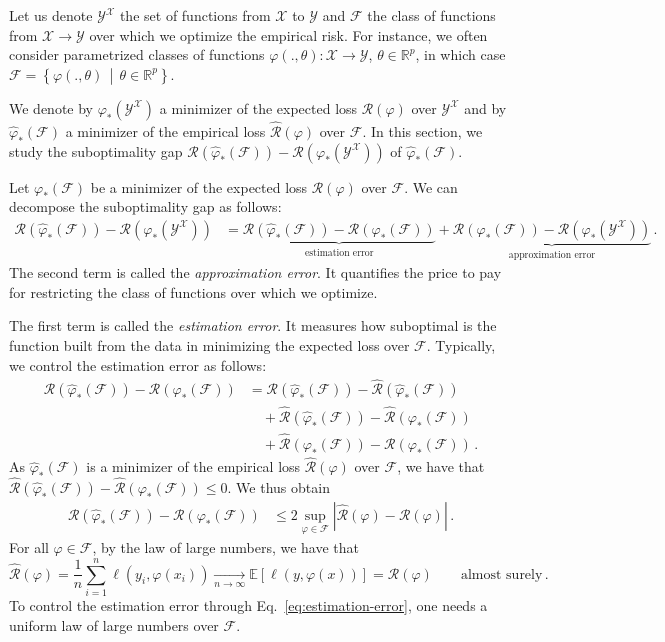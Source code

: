 \documentclass[11pt,reqno]{article}
\newcommand{\E}{\mathbb{E}}
\newcommand{\R}{\mathbb{R}}
\newcommand{\cF}{\mathcal{F}}
\newcommand{\cX}{\mathcal{X}}
\newcommand{\cY}{\mathcal{Y}}
\newcommand{\cR}{\mathcal{R}}
\renewcommand{\leq}{\leqslant}
\numberwithin{equation}{section}
\theoremstyle{plain}
\theoremstyle{definition}
\theoremstyle{remark}
\begin{document}
Let us denote $\cY^\cX$ the set of functions from $\cX$ to $\cY$ and $\cF$ the class of functions from $\cX \to \cY$ over which we optimize the empirical risk. For instance, we often consider parametrized classes of functions $\varphi(., \theta):\cX\to\cY$, $\theta\in \R^p$, in which case $\cF = \left\{\varphi(., \theta) \, \middle\vert \, \theta\in\R^p\right\}$.

We denote by $\varphi_*(\cY^\cX)$ a minimizer of the expected loss $\cR(\varphi)$ over $\cY^\cX$ and by $\widehat{\varphi}_*(\cF)$ a minimizer of the empirical loss $\widehat{\cR}(\varphi)$ over $\cF$. In this section, we study the suboptimality gap $\cR(\widehat{\varphi}_*(\cF)) - \cR(\varphi_*(\cY^\cX))$ of $\widehat{\varphi}_*(\cF)$. 

Let $\varphi_*(\cF)$ be a minimizer of the expected loss $\cR(\varphi)$ over $\cF$. We can decompose the suboptimality gap as follows:
\begin{align*}
	\cR(\widehat{\varphi}_*(\cF)) - \cR(\varphi_*(\cY^\cX)) &= \underbrace{\cR(\widehat{\varphi}_*(\cF)) - \cR(\varphi_*(\cF))}_{\text{estimation error}} + \underbrace{\cR(\varphi_*(\cF)) - \cR(\varphi_*(\cY^\cX))}_{\text{approximation error}} \, .
\end{align*}
The second term is called the \emph{approximation error}. It quantifies the price to pay for restricting the class of functions over which we optimize. 

The first term is called the \emph{estimation error}. It measures how suboptimal is the function built from the data in minimizing the expected loss over $\cF$. Typically, we control the estimation error as follows: 
\begin{align*}
\cR(\widehat{\varphi}_*(\cF)) - \cR(\varphi_*(\cF)) &= \cR(\widehat{\varphi}_*(\cF)) - \widehat{\cR}(\widehat{\varphi}_*(\cF)) \\
&\quad+ \widehat{\cR}(\widehat{\varphi}_*(\cF)) - \widehat{\cR}(\varphi_*(\cF)) \\
&\quad+ \widehat{\cR}(\varphi_*(\cF)) - \cR(\varphi_*(\cF)) \, .
\end{align*}
As $\widehat{\varphi}_*(\cF)$ is a minimizer of the empirical loss $\widehat{\cR}(\varphi)$ over $\cF$, we have that $\widehat{\cR}(\widehat{\varphi}_*(\cF)) - \widehat{\cR}(\varphi_*(\cF)) \leq 0$. We thus obtain
\begin{align}
	\cR(\widehat{\varphi}_*(\cF)) - \cR(\varphi_*(\cF)) &\leq 2 \sup_{\varphi\in\cF} \left|\widehat{\cR}(\varphi) - {\cR}(\varphi)\right| \, . \label{eq:estimation-error}
	\end{align}
	For all $\varphi \in \cF$, by the law of large numbers, we have that
	\begin{equation*}
		\widehat{\cR}(\varphi) = \frac{1}{n} \sum_{i=1}^n \ell(y_i, \varphi(x_i)) \xrightarrow[n\to\infty]{} \E[\ell(y,\varphi(x))] =  {\cR}(\varphi) \qquad \text{almost surely} \, .
	\end{equation*}
To control the estimation error through Eq.~\eqref{eq:estimation-error}, one needs a uniform law of large numbers over $\cF$. 
\end{document}
